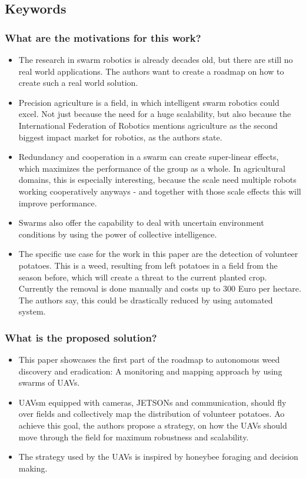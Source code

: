     \subsection*{Keywords}
    
     
    \subsubsection*{What are the motivations for this work?}
    \begin{itemize}
        \item The research in swarm robotics is already decades old, but there are still no real world applications. The authors want to create a roadmap on how to create such a real world solution.
        \item Precision agriculture is a field, in which intelligent swarm robotics could excel. Not just because the need for a huge scalability, but also because the International Federation of Robotics mentions agriculture as the second biggest impact market for robotics, as the authors state.
        \item Redundancy and cooperation in a swarm can create super-linear effects, which maximizes the performance of the group as a whole. In agricultural domains, this is especially interesting, because the scale need multiple robots working cooperatively anyways - and together with those scale effects this will improve performance.
        \item Swarms also offer the capability to deal with uncertain environment conditions by using the power of collective intelligence.
        \item The specific use case for the work in this paper are the detection of volunteer potatoes. This is a weed, resulting from left potatoes in a field from the season before, which will create a threat to the current planted crop. Currently the removal is done manually and costs up to 300 Euro per hectare. The authors say, this could be drastically reduced by using automated system.
    \end{itemize}
    \subsubsection*{What is the proposed solution?}
    \begin{itemize}
        \item This paper showcases the first part of the roadmap to autonomous weed discovery and eradication: A monitoring and mapping approach by using swarms of UAVs.
        \item UAVsm equipped with cameras, JETSONs and communication, should fly over fields and collectively map the distribution of volunteer potatoes. Ao achieve this goal, the authors propose a strategy, on how the UAVs should move through the field for maximum robustness and scalability.
        \item The strategy used by the UAVs is inspired by honeybee foraging and decision making. 
    \end{itemize}
